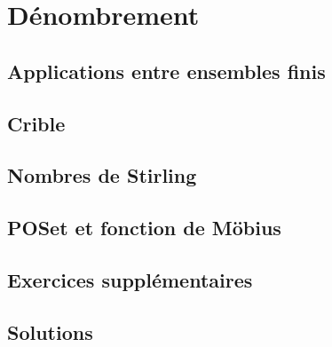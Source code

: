 
\chapter{Dénombrement}
\label{chap:denombrement}

\section{Applications entre ensembles finis}

\section{Crible}

\section{Nombres de Stirling}

\section{POSet et fonction de Möbius}



\section*{Exercices supplémentaires}


\section*{Solutions}

\shipoutAnswer



